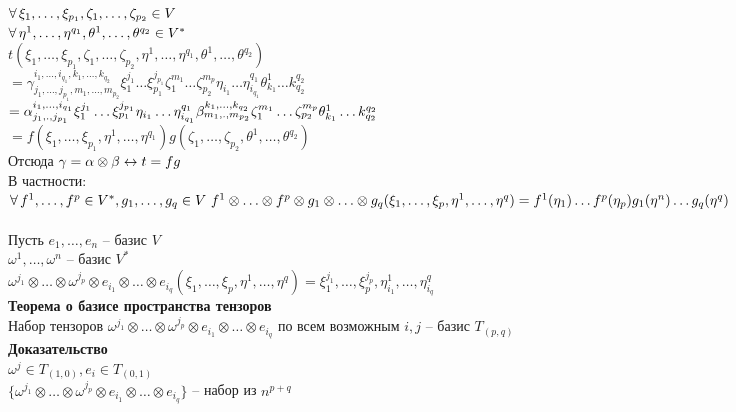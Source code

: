 \documentclass[12pt]{article}
\begin{document}
$\forall\, \xi_1, \ldots, \xi_{p_1}, \zeta_1,\ldots, \zeta_{p_2} \in V$\\
$\forall\, \eta^1,\ldots, \eta^{q_1}, \theta^1,\ldots, \theta^{q_2} \in V^*$\\
$t(\xi_1, \ldots, \xi_{p_1}, \zeta_1,\ldots, \zeta_{p_2}, \eta^1,\ldots, \eta^{q_1}, \theta^1,\ldots, \theta^{q_2})$\\
$ = \gamma_{j_1,\ldots,j_{p_1},m_1, \ldots, m_{p_2}}^{i_1,\ldots, i_{q_1},k_1,\ldots,k_{q_2}} \xi_1^{j_1}\ldots \xi_{p_1}^{j_{p_1}}\zeta_1^{m_1}\ldots \zeta_{p_2}^{m_p}\eta_{i_1}\ldots \eta_{i_{q_1}}^{q_1}\theta_{k_1}^1\ldots k_{q_2}^{q_2}$\\
$=\alpha_{j_1, \ldotp, j_{p_1}}^{i_1, \ldots, i_{q_1}}\xi_1^{j_1}\ldots \xi_{p_1}^{j_{p_1}}\eta_{i_1}\ldots \eta_{i_{q_1}}^{q_1}\beta_{m_1, \ldotp, m_{p_2}}^{k_1, \ldots, k_{q_2}}\zeta_1^{m_1}\ldots \zeta_{p_2}^{m_p}\theta_{k_1}^1\ldots k_{q_2}^{q_2}$\\
$= f(\xi_1, \ldots, \xi_{p_1},\eta^1,\ldots, \eta^{q_1})g(\zeta_1,\ldots, \zeta_{p_2}, \theta^1,\ldots, \theta^{q_2})$\\
Отсюда $\gamma = \alpha \otimes \beta \leftrightarrow t=fg$\\
В частности:\\
$\forall\, f^1,\ldots,f^p \in V^*, g_1, \ldots, g_q \in V\ f^1 \otimes \ldots \otimes f^p \otimes g_1 \otimes \ldots \otimes g_q(\xi_1,\ldots,\xi_p, \eta^1,\ldots,\eta^q) = f^1(\eta_1)\ldots f^p(\eta_p)g_1(\eta^n)\ldots g_q(\eta^q)$\\\\
Пусть $e_1, \ldots, e_n$ -- базис $V$\\
$\omega^1, \ldots, \omega^n$ -- базис $V^*$\\
$\omega^{j_1}\otimes \ldots \otimes \omega^{j_p} \otimes e_{i_1}\otimes\ldots \otimes e_{i_q} (\xi_1,\ldots, \xi_p, \eta^1,\ldots, \eta^q) = \xi_1^{j_1},\ldots, \xi_p^{j_p}, \eta^1_{i_1},\ldots, \eta^q_{i_q}$\\
\textbf{Теорема о базисе пространства тензоров}\\
Набор тензоров $\omega^{j_1}\otimes \ldots \otimes \omega^{j_p} \otimes e_{i_1} \otimes \ldots \otimes e_{i_q}$ по всем возможным $i, j$ -- базис $T_{(p,q)}$\\
\textbf{Доказательство}\\
$\omega^j \in T_{(1,0)}, e_i \in T_{(0,1)}$\\
$\{\omega^{j_1}\otimes \ldots \otimes \omega^{j_p} \otimes e_{i_1} \otimes \ldots \otimes e_{i_q}\}$ -- набор из $n^{p+q}$\\
\end{document}
